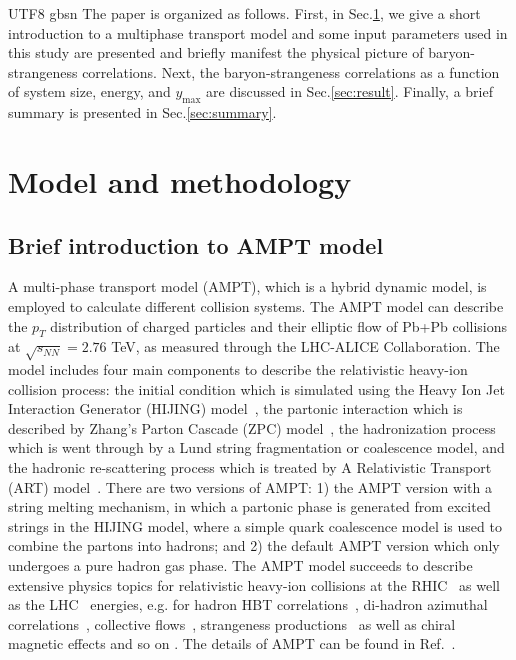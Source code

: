 \documentclass[twocolumn,showpacs,preprintnumbers,amsmath,amssymb]{revtex4-1}
\begin{document}
\begin{CJK*} {UTF8} {gbsn}
	The paper is organized as follows. 
	First, in Sec.\ref{sec:model}, we give a short introduction to a multiphase transport model and some input parameters used in this study are presented
	and briefly manifest the physical picture of baryon-strangeness correlations.
	Next, the baryon-strangeness correlations as a function of system size, energy, and $y_{\text{max}}$ are discussed in Sec.\ref{sec:result}. 
	Finally, a brief summary is presented in Sec.\ref{sec:summary}.
	
	
	\section{Model and methodology}
	\label{sec:model}
	\subsection{Brief introduction to AMPT model}


		A multi-phase transport model (AMPT), which is a hybrid dynamic model, is employed to calculate different collision systems.
	The AMPT model can describe the $p_{T}$ distribution of charged particles \cite{xujun,suppressionhighpt,Ye_2017,JinXH} and their elliptic flow of Pb+Pb collisions
	at $\sqrt{s_{NN}} = 2.76$ TeV, as measured through the LHC-ALICE Collaboration. The model includes four main components to describe
	the relativistic heavy-ion collision process: the initial condition which is simulated using the Heavy Ion Jet Interaction Generator (HIJING) model~\cite{HIJING-1,HIJING-2}, the partonic interaction which is described by Zhang's Parton Cascade (ZPC) model~\cite{ZPCModel}, the hadronization process which is went through by a Lund string fragmentation or coalescence model, and the hadronic re-scattering process which is treated by  A Relativistic Transport (ART) model~\cite{ARTModel}. There are two versions of AMPT: 1) the AMPT version with a string melting mechanism, in which a partonic phase is generated from excited strings in the HIJING model, where a simple quark coalescence model is used to combine the partons into hadrons; and 2) the default AMPT version which only undergoes a pure hadron gas phase. 
	The AMPT model succeeds to describe extensive physics topics for relativistic heavy-ion collisions at the RHIC~\cite{AMPT_origin} as well as the LHC~\cite{AMPTGLM2016} energies, 
e.g. for hadron HBT correlations~\cite{AMPTHBT}, di-hadron azimuthal correlations~\cite{AMPTDiH,WangHai}, collective flows~\cite{STARFlowAMPT,AMPTFlowLHC}, strangeness productions~\cite{JinXH,SciChinaJinS} as well as chiral magnetic effects and so on \cite{Zhao,Huang,Wang,XuZW}.
The details of AMPT can be found in Ref.~\cite{AMPT_origin}.


\end{CJK*}
\end{document}
